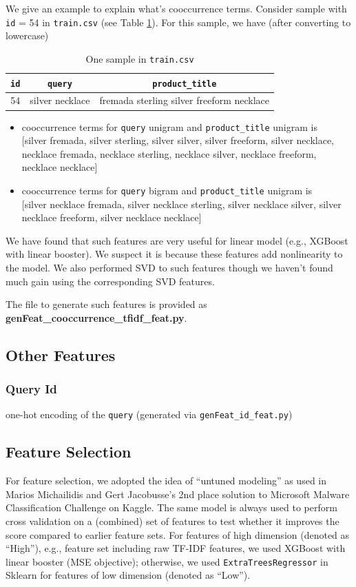 \documentclass[12pt]{article}
\begin{document}
We give an example to explain what's cooccurrence terms. Consider sample with \texttt{id} = 54 in \texttt{train.csv} (see Table \ref{tab:sample_id54}). For this sample, we have (after converting to lowercase)
\begin{table}[!htb]
\centering
\caption{One sample in \texttt{train.csv}}
\label{tab:sample_id54}
\begin{tabular}{|c|c|c|}
\hline
\texttt{id} & \texttt{query} & \texttt{product\_title} \\
\hline
54 & silver necklace & fremada sterling silver freeform necklace\\
\hline
\end{tabular}
\end{table}
\begin{itemize}
\item cooccurrence terms for \texttt{query} unigram and \texttt{product\_title} unigram is\\
$[$silver fremada, silver sterling, silver silver, silver freeform, silver necklace, necklace fremada, necklace sterling, necklace silver, necklace freeform, necklace necklace$]$
\item cooccurrence terms for \texttt{query} bigram and \texttt{product\_title} unigram is\\
$[$silver necklace fremada, silver necklace sterling, silver necklace silver, silver necklace freeform, silver necklace necklace$]$
\end{itemize}
We have found that such features are very useful for linear model (e.g., XGBoost with linear booster). We suspect it is because these features add nonlinearity to the model. We also performed SVD to such features though we haven't found much gain using the corresponding SVD features.

The file to generate such features is provided as \textbf{genFeat\_cooccurrence\_tfidf\_feat.py}.


\subsection{Other Features}
\subsubsection{Query Id}
one-hot encoding of the \texttt{query} (generated via \texttt{genFeat\_id\_feat.py})

\subsection{Feature Selection}
For feature selection, we adopted the idea of ``untuned modeling'' as used in Marios Michailidis and Gert Jacobusse's 2nd place solution \cite{malware_2nd} to Microsoft Malware Classification Challenge on Kaggle. The same model is always used to perform cross validation on a (combined) set of features to test whether it improves the
score compared to earlier feature sets. For features of high dimension (denoted as ``High''), e.g., feature set including raw TF-IDF features, we used XGBoost with linear booster (MSE objective); otherwise, we used \texttt{ExtraTreesRegressor} in Sklearn for features of low dimension (denoted as ``Low'').
\end{document}

